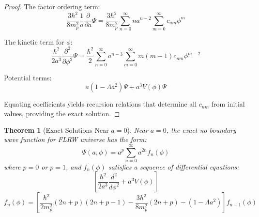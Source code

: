 \documentclass{article}
\newtheorem{theorem}{Theorem}
\begin{document}
\begin{proof}
The factor ordering term:
\begin{equation}
\frac{3\hbar^2}{8m_p^2}\frac{1}{a}\frac{\partial}{\partial a}\Psi = \frac{3\hbar^2}{8m_p^2}\sum_{n=0}^{\infty}na^{n-2}\sum_{m=0}^{\infty}c_{nm}\phi^m
\end{equation}

The kinetic term for $\phi$:
\begin{equation}
\frac{\hbar^2}{2a^3}\frac{\partial^2}{\partial \phi^2}\Psi = \frac{\hbar^2}{2}\sum_{n=0}^{\infty}a^{n-3}\sum_{m=0}^{\infty}m(m-1)c_{nm}\phi^{m-2}
\end{equation}

Potential terms:
\begin{equation}
a(1-\Lambda a^2)\Psi + a^3V(\phi)\Psi
\end{equation}

Equating coefficients yields recursion relations that determine all $c_{nm}$ from initial values, providing the exact solution.
\end{proof}

\begin{theorem}[Exact Solutions Near $a = 0$]
  Near $a = 0$, the exact no-boundary wave function for FLRW universe has the
  form:
  \begin{equation}
    \Psi (a, \phi) = a^p  \sum_{n = 0}^{\infty} a^{2 n} f_n (\phi)
  \end{equation}
  where $p = 0$ or $p = 1$, and $f_n (\phi)$ satisfies a sequence of
  differential equations:
  \begin{equation}
    \left[ \frac{\hbar^2}{2 a^3}  \frac{d^2}{d \phi^2} + a^3 V (\phi) \right]
  \end{equation}
  \begin{equation}
    f_n (\phi) = \left[ \frac{\hbar^2}{2 m_p^2} (2 n + p) (2 n + p - 1) -
    \frac{3 \hbar^2}{8 m_p^2} (2 n + p) - (1 - \Lambda a^2) \right] f_{n - 1}
    (\phi)
  \end{equation}
\end{theorem}
\end{document}
